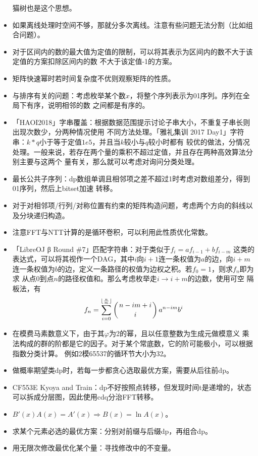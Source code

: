 \begin{itemize}
	猫树也是这个思想。
	\item 如果离线处理时空间不够，那就分多次离线。注意有些问题无法分割（比如组合问题）。
	\item 对于区间内的数的最大值为定值的限制，可以将其表示为区间内的数不大于该定值的方案扣除区间内的数
	不大于该定值-1的方案。
	\item 矩阵快速幂时若时间复杂度不优则观察矩阵的性质。
	\item 与排序有关的问题：考虑枚举某个数$x$，将整个序列表示为01序列。序列在全局下有序，说明相邻的数
	之间都是有序的。
	\item 「HAOI2018」字串覆盖：根据数据范围提示讨论子串大小，不重复子串长则出现次数少，分两种情况使用
	不同方法处理。「雅礼集训 2017 Day1」字符串：$k*q$小于等于定值$1e5$，并且当$k$较小与$q$较小时都有
	较优的做法，分情况处理。一般来说，若存在两个量的乘积不超过定值，并且存在两种高效算法分别主要与这两个
	量有关，那么就可以考虑对询问分类处理。
	\item 最长公共子序列：dp数组单调且相邻项之差不超过1时考虑对数组差分，得到01序列，然后上bitset加速
	转移。
	\item 对于对相邻项/行列/对称位置有约束的矩阵构造问题，考虑两个方向的斜线以及分块递归构造。
	\item 注意FFT与NTT计算的是循环卷积，可以利用此性质优化常数。
	\item 「LibreOJ β Round \#7」匹配字符串：对于类似于$f_i=af_{i-1}+bf_{i-m}$
	这类的表达式，可以将其视作一个DAG，其中$i$向$i+1$连一条权值为$a$的边，向$i+m$
	连一条权值为$b$的边，定义一条路径的权值为边权之积。若$f_0=1$，则求$f_n$即为求
	从点0到点$n$的路径权值和。那么考虑枚举走$i\rightarrow i+m$的边数，使用可空
	隔板法，有
	\begin{displaymath}
		f_n=\sum_{i=0}^{\lfloor\frac{n}{m}\rfloor}{\left(n-im+i \atop i\right)a^{n-im}b^i}
	\end{displaymath}
	\item 在模费马素数意义下，由于其$\varphi$为2的幂，且以任意整数为生成元做模意义
	乘法构成的群的阶都是它的因子。对于某个常底数，它的阶可能极小，可以根据指数分类计算。
	例如2模65537的循环节大小为32。
	\item 做概率期望类dp时，若每一步都贪心选取最优方案，需要从后往前dp。
	\item CF553E Kyoya and Train：dp不好按照点转移，但发现时间t是递增的，状态
	可以拆成分层图，因此使用cdq分治FFT转移。
	\item $B'(x)A(x)=A'(x)\Rightarrow B(x)=\ln A(x)$。
	\item 求某个元素必选的最优方案：分别对前缀与后缀dp，再组合dp。
	\item 用无限次修改最优化某个量：寻找修改中的不变量。

\end{itemize}
